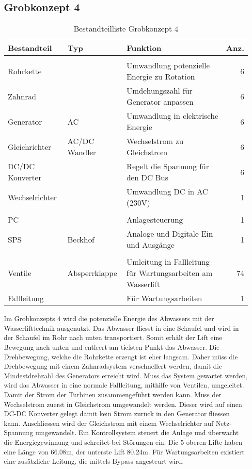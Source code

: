 \subsection{Grobkonzept 4} \label{subsec:grobkonzept3}
\begin{table}[H]
\small
\begin{tabular}{>{\HY\RaggedRight}p{3cm} >{\HY\RaggedRight}p{3.6cm} >{\HY\RaggedRight}p{6.9cm} r}
\hline
\textbf{Bestandteil}&\textbf{Typ}&\textbf{Funktion}&\textbf{Anz.}\\
\hline

\rowcolor{hellgrau}
\multicolumn{4}{l}{\textbf{Stromerzeugung}}\T\\
Rohrkette&&Umwandlung potenzielle Energie zu Rotation&6\\
Zahnrad&&Umdehungszahl für Generator anpassen&6\\
Generator&AC&Umwandlung in elektrische Energie&6\\
Gleichrichter&AC/DC Wandler&Wechselstrom zu Gleichstrom&6\\
DC/DC Konverter&&Regelt die Spannung für den DC Bus&6\\
Wechselrichter&&Umwandlung DC in AC (230V)&1\B\\

\rowcolor{hellgrau}
\multicolumn{4}{l}{\textbf{Kontrollsystem}}\T\\
PC&&Anlagesteuerung&1\\
SPS&Beckhof&Analoge und Digitale Ein- und Ausgänge&1\B\\

\rowcolor{hellgrau}
\multicolumn{4}{l}{\textbf{Abwassertechnik}}\T\\
Ventile&Absperrklappe&Umleitung in Fallleitung für Wartungsarbeiten am Wasserlift&74\\
Fallleitung&&Für Wartungsarbeiten&1\B\\

\hline
\end{tabular}
\caption{Bestandteilliste Grobkonzept 4}\label{tab:BLGrobkonzept4}
\end{table}
Im Grobkonzepts 4 wird die potenzielle Energie des Abwassers mit der Wasserlifttechnik ausgenutzt. Das Abwasser fliesst in eine Schaufel und wird in der Schaufel im Rohr nach unten transportiert. Somit erhält der Lift eine Bewegung nach unten und entleert am tiefsten Punkt das Abwasser. Die Drehbewegung, welche die Rohrkette erzeugt ist eher langsam. Daher müss die Drehbewegung mit einem Zahnradsystem verschnellert werden, damit die Mindestdrehzahl des Generators erreicht wird. Muss das System gewartet werden, wird das Abwasser in eine normale Fallleitung, mithilfe von Ventilen, umgeleitet. Damit der Strom der Turbinen zusammengeführt werden kann. Muss der Wechselstrom zuerst in Gleichstrom umgewandelt werden. Dieser wird auf einen DC-DC Konverter gelegt damit kein Strom zurück in den Generator fliessen kann. Anschliessen wird der Gleichstrom mit einem Wechselrichter auf Netz-Spannung umgewandelt. Ein Kontrollsystem steuert die Anlage und überwacht die Energiegewinnung und schreitet bei Störungen ein. Die 5 oberen Lifte haben eine Länge von 66.08m, der unterste Lift 80.24m. Für Wartungsarbeiten existiert eine zusätzliche Leitung, die mittels Bypass angesteurt wird.

